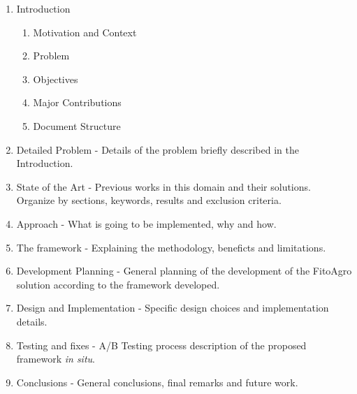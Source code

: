\begin{enumerate}
	\item Introduction
	\begin{enumerate}
		\item Motivation and Context
		\item Problem
		\item Objectives
		\item Major Contributions
		\item Document Structure
	\end{enumerate}
	\item Detailed Problem - Details of the problem briefly described in the Introduction.
	\item State of the Art - Previous works in this domain and their solutions. Organize by sections, keywords, results and exclusion criteria.
	\item Approach - What is going to be implemented, why and how.
	\item The framework - Explaining the methodology, beneficts and limitations.
	\item Development Planning - General planning of the development of the FitoAgro solution according to the framework developed.
	\item Design and Implementation - Specific design choices and implementation details.
	\item Testing and fixes - A/B Testing process description of the proposed framework \textit{in situ}.
	\item Conclusions - General conclusions, final remarks and future work.
\end{enumerate}

